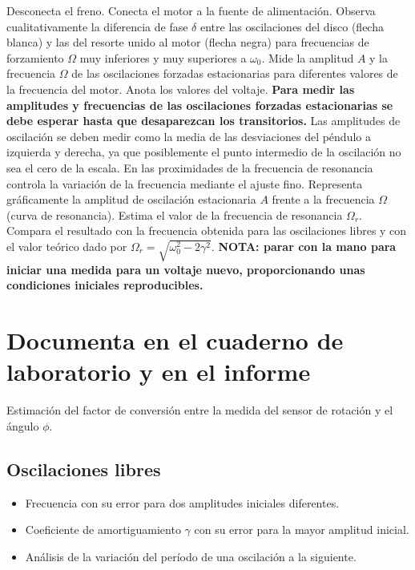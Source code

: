 \documentclass[11pt]{articulo}
\begin{document}
Desconecta el freno. Conecta el motor a la fuente de alimentaci\'on. Observa cualitativamente la diferencia de fase $\delta$ entre las oscilaciones del disco (flecha blanca) y las del resorte unido al motor (flecha negra) para frecuencias de forzamiento $\Omega$ muy inferiores y muy superiores a $\omega_0$. Mide la amplitud $A$ y la frecuencia $\Omega$ de las oscilaciones forzadas estacionarias para diferentes valores de la frecuencia del motor. Anota los valores del voltaje. {\bf Para medir las amplitudes y frecuencias de las oscilaciones forzadas estacionarias se debe esperar hasta que desaparezcan los transitorios.} Las amplitudes de oscilaci\'on se deben medir como la media de las desviaciones del p\'endulo a izquierda y derecha, ya que posiblemente el punto intermedio de la oscilaci\'on no sea el cero de la escala. En las proximidades de la frecuencia de resonancia controla la variaci\'on de la frecuencia mediante el ajuste fino. Representa gr\'aficamente la amplitud de oscilaci\'on estacionaria $A$ frente a la frecuencia $\Omega$ (curva de resonancia). Estima el valor de la frecuencia de resonancia $\Omega_r$. Compara el resultado con la frecuencia obtenida para las oscilaciones libres y con el valor te\'orico dado por $\Omega_r = \sqrt{\omega_0^2 - 2\gamma^2}$. {\bf NOTA: parar con la mano para iniciar una medida para un voltaje nuevo, proporcionando unas condiciones iniciales reproducibles.}


\section*{Documenta en el cuaderno de laboratorio y en el informe}

Estimaci\'on del factor de conversi\'on entre la medida del sensor de rotaci\'on y el \'angulo $\phi$.

\subsection*{Oscilaciones libres}

\begin{itemize}

\item{Frecuencia con su error para dos amplitudes iniciales diferentes.}
\item{Coeficiente de amortiguamiento $\gamma$ con su error para la mayor amplitud inicial.}
\item{An\'alisis de la variaci\'on del per\'iodo de una oscilaci\'on a la siguiente.}

\end{itemize}
\end{document}
